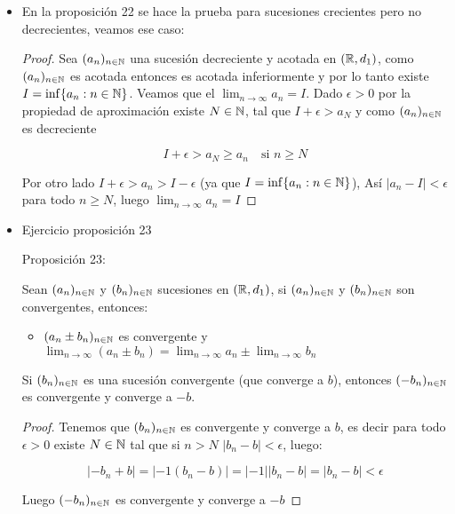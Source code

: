 \begin{itemize}[label={✎}]
\item En la proposición 22 se hace la prueba para sucesiones crecientes pero no decrecientes, veamos ese caso:\\

\begin{proof}
Sea $(a_n)_{n  \in \mathbb{N}}$ una sucesión decreciente y acotada en $(\mathbb{R},d_1)$, como $(a_n)_{n\in \mathbb{N}}$ es acotada entonces es acotada inferiormente y por lo tanto existe $I=\inf\{a_n: n\in \mathbb{N}\}$. Veamos que el $\lim_{n\to \infty}a_n=I$. Dado $\epsilon>0$ por la propiedad de aproximación existe $N\in \mathbb{N}$, tal que $I+\epsilon>a_N$ y como $(a_n)_{n\in \mathbb{N}}$ es decreciente

$$I+\epsilon>a_N\geq a_n\quad \text{si }n \geq N$$

Por otro lado $I+\epsilon>a_n>I-\epsilon$ (ya que $I=\inf\{a_n: n\in \mathbb{N}\}$), Así $|a_n-I|<\epsilon$ para todo $n\geq N$, luego $\lim_{n\to\infty}a_n=I$
\end{proof}

\item Ejercicio proposición 23\\

\begin{theorem}{Proposición 23:}

Sean $(a_n)_{n\in \mathbb{N}}$ y $(b_n)_{n\in \mathbb{N}}$ sucesiones en $(\mathbb{R},d_1)$, si $(a_n)_{n\in \mathbb{N}}$ y $(b_n)_{n \in \mathbb{N}}$ son convergentes, entonces:

\begin{itemize}
    \item $(a_n\pm b_n)_{n\in \mathbb{N}}$ es convergente y $\lim_{n \to \infty}(a_n\pm b_n)=\lim_{n \to \infty} a_n\pm \lim_{n \to \infty} b_n $
\end{itemize}
\end{theorem}

\begin{lemma}
Si $(b_n)_{n\in \mathbb{N}}$ es una sucesión convergente (que converge a $b$), entonces $(-b_n)_{n\in \mathbb{N}}$ es convergente y converge a $-b$.
\end{lemma}

\begin{proof}
Tenemos que $(b_n)_{n\in \mathbb{N}}$ es convergente y converge a $b$, es decir para todo $\epsilon>0$ existe $N\in \mathbb{N}$ tal que si $n>N$ $|b_n-b|<\epsilon$, luego:

$$|-b_n+b|=|-1(b_n-b)|=|-1||b_n-b|=|b_n-b|<\epsilon$$

Luego $(-b_n)_{n\in\mathbb{N}}$ es convergente y converge a $-b$
\end{proof}


\end{itemize}

